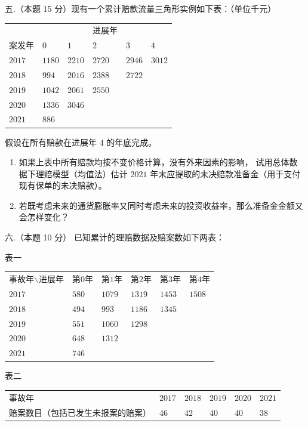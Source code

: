 五.（本题 15 分）现有一个累计赔款流量三角形实例如下表：（单位千元）
\begin{center}
\begin{tabular}{|l|l|l|l|l|l|}
 & & & 进展年 & & \\
案发年 & $0$ & $1$ & $2$ & $3$ & $4$ \\
$2017$ & $1180$ & $2210$ & $2720$ & $2946$ & $3012$ \\
$2018$ & $994$ & $2016$ & $2388$ & $2722$ & \\
$2019$ & $1042$ & $2061$ & $2550$ & & \\
$2020$ & $1336$ & $3046$ & & & \\
$2021$ & $886$ & & & & 
\end{tabular}
\end{center}
假设在所有赔款在进展年 $4$ 的年底完成。
\begin{enumerate}[label=(\arabic*)]
\item 如果上表中所有赔款均按不变价格计算，没有外来因素的影响，
试用总体数据下理赔模型（均值法）估计 $2021$ 年末应提取的未决赔款准备金（用于支付现有保单的未决赔款）。
\item 若既考虑未来的通货膨胀率又同时考虑未来的投资收益率，那么准备金金额又会怎样变化？
\end{enumerate}

六.（本题 10 分）
已知累计的理赔数据及赔案数如下两表：
\begin{center}
    表一
\end{center}
\begin{table}
\begin{tabular}{|l|l|l|l|l|l|}
事故年$\backslash$进展年 & 第$0$年 & 第$1$年 & 第$2$年 & 第$3$年 & 第$4$年 \\
$2017$ & $580$ & $1079$ & $1319$ & $1453$ & $1508$ \\
$2018$ & $494$ & $993$ & $1186$ & $1345$ & \\
$2019$ & $551$ & $1060$ & $1298$ & & \\
$2020$ & $648$ & $1312$ & & & \\
$2021$ & $746$ & & & & 
\end{tabular}
\end{table}
\begin{center}
    表二
\end{center}
\begin{table}
\begin{tabular}{|l|l|l|l|l|l|}
事故年 & $2017$ & $2018$ & $2019$ & $2020$ & $2021$ \\
赔案数目（包括已发生未报案的赔案）& $46$ & $42$ & $40$ & $40$ & $38$ 
\end{tabular}
\end{table}

